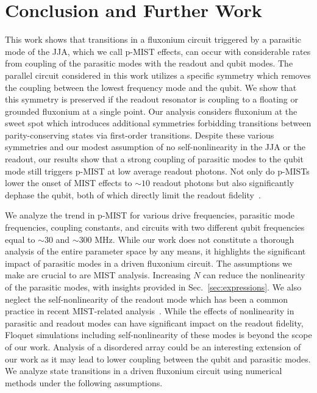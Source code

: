 \documentclass[prx,showpacs,notitlepage,twocolumn,superscriptaddress,nofootinbib,preprintnumbers,floatfix]{revtex4-2}
\begin{document}
\section{Conclusion and Further Work}\label{sec:conclusion}
This work shows that transitions in a fluxonium circuit triggered by a parasitic mode of the JJA, which we call p-MIST effects, can occur with considerable rates from coupling of the parasitic modes with the readout and qubit modes. The parallel circuit considered in this work utilizes a specific symmetry which removes the coupling between the lowest frequency mode and the qubit. We show that this symmetry is preserved if the readout resonator is coupling to a floating or grounded fluxonium at a single point. Our analysis considers fluxonium at the sweet spot which introduces additional symmetries forbidding transitions between parity-conserving states via first-order transitions. Despite these various symmetries and our modest assumption of no self-nonlinearity in the JJA or the readout, our results show that a strong coupling of parasitic modes to the qubit mode still triggers p-MIST at low average readout photons. Not only do p-MISTs lower the onset of MIST effects to $\sim 10$ readout photons but also significantly dephase the qubit, both of which directly limit the readout fidelity~\cite{hazra2024benchmarking}. 


We analyze the trend in p-MIST for various drive frequencies, parasitic mode frequencies, coupling constants, and circuits with two different qubit frequencies equal to $\sim 30$ and $\sim 300$ MHz. While our work does not constitute a thorough analysis of the entire parameter space by any means, it highlights the significant impact of parasitic modes in a driven fluxonium circuit. The assumptions we make are crucial to are MIST analysis. Increasing $N$ can reduce the nonlinearity of the parasitic modes, with insights provided in Sec.~\ref{sec:expressions}. We also neglect the self-nonlinearity of the readout mode which has been a common practice in recent MIST-related analysis~\cite{shillito2022dynamics,dumas2024unified,cohen2023reminiscence}. While the effects of nonlinearity in parasitic and readout modes can have significant impact on the readout fidelity, Floquet simulations including self-nonlinearity of these modes is beyond the scope of our work. Analysis of a disordered array could be an interesting extension of our work as it may lead to lower coupling between the qubit and parasitic modes. We analyze state transitions in a driven fluxonium circuit  using numerical methods under the following assumptions. 
\end{document}

